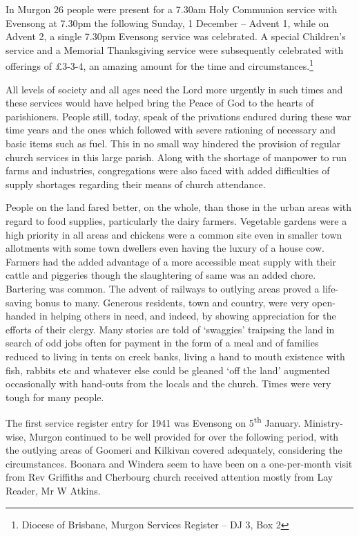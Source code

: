 In Murgon 26 people were present for a 7.30am Holy Communion service
with Evensong at 7.30pm the following Sunday, 1 December -- Advent 1,
while on Advent 2, a single 7.30pm Evensong service was celebrated. A
special Children's service and a Memorial Thanksgiving service were
subsequently celebrated with offerings of \pounds3-3-4, an amazing amount for
the time and circumstances.\footnote{Diocese of Brisbane, Murgon
  Services Register -- DJ 3, Box 2}

All levels of society and all ages need the Lord more urgently in such
times and these services would have helped bring the Peace of God to the
hearts of parishioners. People still, today, speak of the privations
endured during these war time years and the ones which followed with
severe rationing of necessary and basic items such as fuel. This in no
small way hindered the provision of regular church services in this
large parish. Along with the shortage of manpower to run farms and
industries, congregations were also faced with added difficulties of
supply shortages regarding their means of church attendance.

People on the land fared better, on the whole, than those in the urban
areas with regard to food supplies, particularly the dairy farmers.
Vegetable gardens were a high priority in all areas and chickens were a
common site even in smaller town allotments with some town dwellers even
having the luxury of a house cow. Farmers had the added advantage of a
more accessible meat supply with their cattle and piggeries though the
slaughtering of same was an added chore. Bartering was common. The
advent of railways to outlying areas proved a life-saving bonus to many.
Generous residents, town and country, were very open-handed in helping
others in need, and indeed, by showing appreciation for the efforts of
their clergy. Many stories are told of `swaggies' traipsing the land in
search of odd jobs often for payment in the form of a meal and of
families reduced to living in tents on creek banks, living a hand to
mouth existence with fish, rabbits etc and whatever else could be
gleaned `off the land' augmented occasionally with hand-outs from the
locals and the church. Times were very tough for many people.

The first service register entry for 1941 was Evensong on
5\textsuperscript{th} January. Ministry-wise, Murgon continued to be
well provided for over the following period, with the outlying areas of
Goomeri and Kilkivan covered adequately, considering the circumstances.
Boonara and Windera seem to have been on a one-per-month visit from Rev
Griffiths and Cherbourg church received attention mostly from Lay
Reader, Mr W Atkins.

